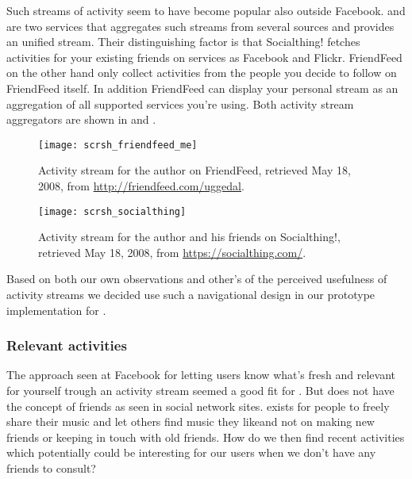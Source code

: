 Such streams of activity seem to have become popular also outside Facebook.
 and  are two services that
aggregates such streams from several sources and provides an unified stream.
Their distinguishing factor is that Socialthing! fetches activities for your
existing friends on services as Facebook and Flickr. FriendFeed on the other
hand only collect activities from the people you decide to follow on
FriendFeed itself. In addition FriendFeed can display your personal stream
as an aggregation of all supported services you're using. Both activity stream
aggregators are shown in  and
.

\begin{figure}
  \begin{whole}
    \texttt{[image: scrsh\_friendfeed\_me]}
    \caption[FriendFeed Activity Stream]{
      Activity stream for the author on FriendFeed,
      retrieved May 18, 2008, from
      \url{http://friendfeed.com/uggedal}.
    }
    \label{figure:scrsh.friendfeed.me}
  \end{whole}
\end{figure}

\begin{figure}
  \begin{whole}
    \texttt{[image: scrsh\_socialthing]}
    \caption[Socialthing! Activity Stream]{
      Activity stream for the author and his friends on Socialthing!,
      retrieved May 18, 2008, from
      \url{https://socialthing.com/}.
    }
    \label{figure:scrsh.socialthing}
  \end{whole}
\end{figure}

Based on both our own observations and other's of the perceived
usefulness of activity streams we decided use such a navigational design in our
prototype implementation for \urort{}.

\subsubsection{Relevant activities}

The approach seen at Facebook for letting users know what's fresh and relevant
for yourself trough an activity stream seemed a good fit for \urort{}. But
\urort{} does not have the concept of friends as seen in social network sites.
\urort{} exists for people to freely share their music and let others find
music they like\dash{}and not on making new friends or keeping in touch with
old friends. How do we then find recent activities which potentially could be
interesting for our users when we don't have any friends to consult?

